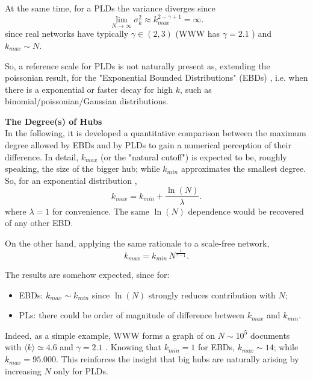 \documentclass[a4paper,10pt,twoside]{book} %
\theoremstyle{definition}
\begin{document}
At the same time, for a PLDs the variance diverges since \cite{barabasi::2016networkbook}	
\begin{equation}
	\lim_{N \to \infty} \sigma_k^2 \approx k_{max}^{2-\gamma+1} = \infty.
	\label{eq:kn_SFnets}
\end{equation}
since real networks have typically $\gamma \in (2,3)$ (WWW has $\gamma =  2.1$ \cite{barabasi::2016networkbook}) and $k_{max} \sim N$. 

So, a reference scale for PLDs is not naturally present as, extending the poissonian result, for the "Exponential Bounded Distributions" (EBDs) \cite{barabasi::2016networkbook}, i.e. when there is a exponential or faster decay for high $k$, such as binomial/poissonian/Gaussian distributions.

{\large \textbf{The Degree(s) of Hubs}} \\
In the following, it is developed a quantitative comparison between the maximum degree allowed by EBDs and by PLDs to gain a numerical perception of their difference.
In detail, $k_{max}$ (or the "natural cutoff") is expected to be, roughly speaking, the size of the bigger hub; while $k_{min}$ approximates the smallest degree.
So, for an exponential distribution \cite{barabasi::2016networkbook}, 
\begin{equation}
	k_{max} = k_{min} + \frac{\ln(N)}{\lambda}.
	\label{eq:Expkmax_up}	
\end{equation}
where $\lambda = 1$ for convenience. The same $\ln(N)$ dependence would be recovered of any other EBD.

On the other hand, applying the same rationale to a scale-free network, 
\begin{equation}
	k_{max} = k_{min}\,N^{\frac{1}{\gamma-1}}.
	\label{eq:SFkmax_up}
\end{equation}

The results are somehow expected, since for:
\begin{itemize}
	\item EBDs: $k_{max} \sim k_{min}$ since $\ln(N)$ strongly reduces contribution with $N$;
	\item PLs: there could be order of magnitude of difference between $k_{max}$ and $k_{min}$.
\end{itemize} 
Indeed, as a simple example, WWW forms a graph of on $N \sim 10^5$ documents with $\langle k \rangle \simeq 4.6$ and $\gamma = 2.1$ \cite{barabasi::2016networkbook}. 
Knowing that $k_{min} = 1$ for EBDs, $k_{max} \sim 14$; while $k_{max} = 95.000$. 
This reinforces the insight that big hubs are naturally arising by increasing $N$ only for PLDs.
\label{sec:SFProperties_up}
\end{document}

